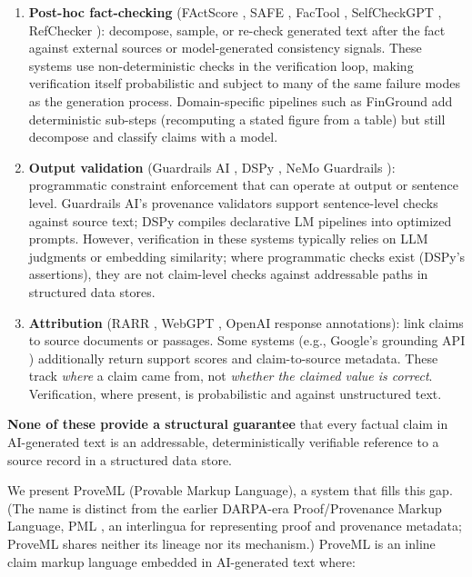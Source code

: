 \documentclass[11pt,a4paper]{article}
\begin{document}
\begin{enumerate}
    \item \textbf{Post-hoc fact-checking} (FActScore \citep{factscore}, SAFE \citep{safe}, FacTool \citep{factool}, SelfCheckGPT \citep{selfcheckgpt}, RefChecker \citep{refchecker}): decompose, sample, or re-check generated text after the fact against external sources or model-generated consistency signals. These systems use non-deterministic checks in the verification loop, making verification itself probabilistic and subject to many of the same failure modes as the generation process. Domain-specific pipelines such as FinGround \citep{finground} add deterministic sub-steps (recomputing a stated figure from a table) but still decompose and classify claims with a model.
    \item \textbf{Output validation} (Guardrails AI \citep{guardrails}, DSPy \citep{dspy}, NeMo Guardrails \citep{nemo}): programmatic constraint enforcement that can operate at output or sentence level. Guardrails AI's provenance validators support sentence-level checks against source text; DSPy compiles declarative LM pipelines into optimized prompts. However, verification in these systems typically relies on LLM judgments or embedding similarity; where programmatic checks exist (DSPy's assertions), they are not claim-level checks against addressable paths in structured data stores.
    \item \textbf{Attribution} (RARR \citep{rarr}, WebGPT \citep{webgpt}, OpenAI response annotations): link claims to source documents or passages. Some systems (e.g., Google's grounding API \citep{googleground}) additionally return support scores and claim-to-source metadata. These track \textit{where} a claim came from, not \textit{whether the claimed value is correct}. Verification, where present, is probabilistic and against unstructured text.
\end{enumerate}

\textbf{None of these provide a structural guarantee} that every factual claim in AI-generated text is an addressable, deterministically verifiable reference to a source record in a structured data store.

We present ProveML (Provable Markup Language), a system that fills this gap. (The name is distinct from the earlier DARPA-era Proof/Provenance Markup Language, PML \citep{pml}, an interlingua for representing proof and provenance metadata; ProveML shares neither its lineage nor its mechanism.) ProveML is an inline claim markup language embedded in AI-generated text where:
\end{document}
